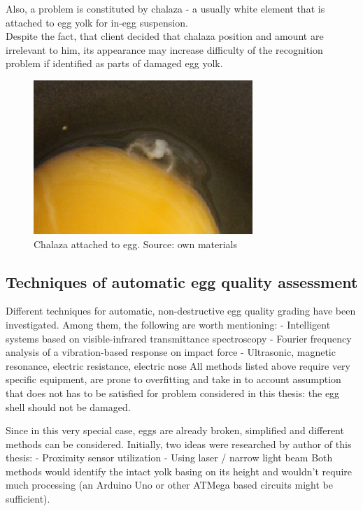 \documentclass[12pt,twoside,a4paper]{article}
\begin{document}
Also, a problem is constituted by chalaza - a usually white element that is attached to egg yolk for in-egg suspension.\\
Despite the fact, that client decided that chalaza position and amount are irrelevant to him, its appearance may increase difficulty of the recognition problem if identified as parts of damaged egg yolk.

 
\begin{figure}[H]
\centering
\includegraphics[width=0.4\paperwidth]{chalaza}
\caption{Chalaza attached to egg. Source: own materials}
\end{figure}


\subsection{Techniques of automatic egg quality assessment}

Different techniques for automatic, non-destructive egg quality grading have been investigated.
Among them, the following are worth mentioning:
- Intelligent systems based on visible-infrared transmittance spectroscopy\cite{agri}
- Fourier frequency analysis of a vibration-based response on impact force\cite{svm} 
- Ultrasonic, magnetic resonance, electric resistance, electric nose\cite{nondestr}  
All methods listed above require very specific equipment, are prone to overfitting and take in to account assumption that does not has to be satisfied for problem considered in this thesis: the egg shell should not be damaged.

Since in this very special case, eggs are already broken, simplified and different methods can be considered.
Initially, two ideas were researched by author of this thesis:
- Proximity sensor utilization
- Using laser / narrow light beam 
Both methods would identify the intact yolk basing on its height and wouldn’t require much processing (an Arduino Uno or other ATMega based circuits might be sufficient).
\end{document}
